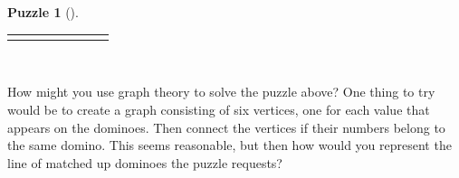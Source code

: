 \documentclass[10pt,]{book}
\theoremstyle{plain}
\theoremstyle{definition}
\theoremstyle{definition}
\theoremstyle{definition}
\newtheorem{investigation}[project]{Puzzle}
\numberwithin{equation}{chapter}
\newcommand{\threedots}{
+(.25,.25) \v +(.5, .5) \v +(.75,.75) \v
}
\newcommand{\sixdots}{
  +(.25,.5) \v +(.75,.5) \v +(.25,.25) \v +(.25,.75) \v +(.75,.25) \v +(.75,.75) \v
}
\newcommand{\dominoborder}{
  \draw[thick, rounded corners] (0,0) rectangle (1,2);
  \draw[thin] (0,1) -- (1,1);
}
\newlength{\panelmax}
\newcommand{\vtx}[2]{node[fill,circle,inner sep=0pt, minimum size=4pt,label=#1:#2]{}}
\renewcommand{\v}{\vtx{above}{}}
\begin{document}
\begin{investigation}[]
{\begin{lrbox}{\panelboxHimage}
{{
}
}\end{lrbox}
\ifdefined\phHimage\else\newlength{\phHimage}\fi%
\setlength{\phHimage}{\ht\panelboxHimage+\dp\panelboxHimage}
\settototalheight{\phHimage}{\usebox{\panelboxHimage}}
\setlength{\panelmax}{\maxof{\panelmax}{\phHimage}}
\leavevmode%
\setlength{\tabcolsep}{0.0125\linewidth}
\par\medskip\noindent
\hspace*{0.0125\linewidth}%
\begin{tabular}{@{}*{8}{c}@{}}
\begin{minipage}[c][\panelmax][t]{0.1\linewidth}\usebox{\panelboxAimage}\end{minipage}&
\begin{minipage}[c][\panelmax][t]{0.1\linewidth}\usebox{\panelboxBimage}\end{minipage}&
\begin{minipage}[c][\panelmax][t]{0.1\linewidth}\usebox{\panelboxCimage}\end{minipage}&
\begin{minipage}[c][\panelmax][t]{0.1\linewidth}\usebox{\panelboxDimage}\end{minipage}&
\begin{minipage}[c][\panelmax][t]{0.1\linewidth}\usebox{\panelboxEimage}\end{minipage}&
\begin{minipage}[c][\panelmax][t]{0.1\linewidth}\usebox{\panelboxFimage}\end{minipage}&
\begin{minipage}[c][\panelmax][t]{0.1\linewidth}\usebox{\panelboxGimage}\end{minipage}&
\begin{minipage}[c][\panelmax][t]{0.1\linewidth}\usebox{\panelboxHimage}\end{minipage}\end{tabular}\\
}%
\end{investigation}
\hypertarget{p-126}{}%
How might you use graph theory to solve the puzzle above?  One thing to try would be to create a graph consisting of six vertices, one for each value that appears on the dominoes.  Then connect the vertices if their numbers belong to the same domino.  This seems reasonable, but then how would you represent the line of matched up dominoes the puzzle requests?%
\end{document}
